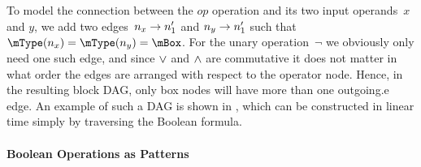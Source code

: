 To model the connection between the $\mathit{op}$ operation and its two input
operands~$x$ and $y$, we add two \glspl{edge}~$n_x \rightarrow n'_1$ and
$n_y \rightarrow n'_1$ such that \mbox{$\mType(n_x) = \mType(n_y) = \mBox$}.
%
For the unary operation~$\neg$ we obviously only need one such \gls{edge}, and
since $\vee$ and $\wedge$ are commutative it does not matter in what order the
\glspl{edge} are arranged with respect to the operator \gls{node}.
%
Hence, in the resulting \gls{block DAG}, only \glspl{box node} will have more
than one \gls{outgoing.e} \gls{edge}.
%
An example of such a \gls{DAG} is shown in
, which can be constructed in linear
time simply by traversing the Boolean formula.


\paragraph{Boolean Operations as Patterns}

\def\mPSat{P_{\mathsc{sat}}}


